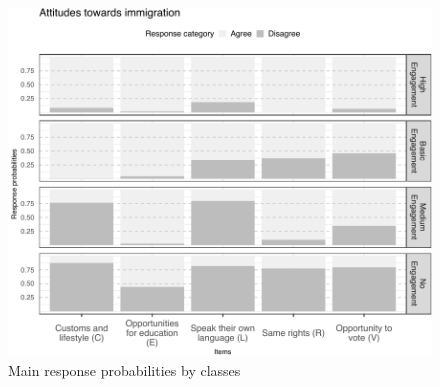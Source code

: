 \documentclass[
  12pt,
]{article}
\begin{document}
\begin{figure}
\centering
\includegraphics{Figs/cond2-1.pdf}
\caption{\label{fig:cond2}Main response probabilities by classes}
\end{figure}
\end{document}
